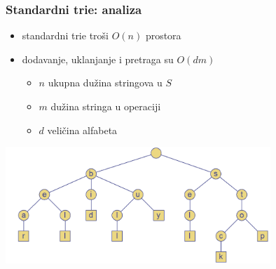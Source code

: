 \documentclass[compress]{beamer}
\begin{document}
\begin{frame}[fragile]
  \frametitle{Standardni trie: analiza}
  \begin{itemize}
    \item standardni trie troši $O(n)$ prostora
    \item dodavanje, uklanjanje i pretraga su $O(dm)$
    \begin{itemize}
      \item $n$ ukupna dužina stringova u $S$
      \item $m$ dužina stringa u operaciji
      \item $d$ veličina alfabeta
    \end{itemize}
  \end{itemize}
  \begin{center}
    \includegraphics[width=10cm]{asp-13-pic18.png}
  \end{center}
\end{frame}
\end{document}
